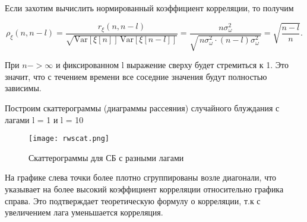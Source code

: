 Если захотим вычислить нормированный коэффициент корреляции, то получим

\[
\rho_{\xi}(n, n-l) = \frac{r_{\xi}(n, n-l)}{\sqrt{\mathrm{Var}[\xi[n]] \, \mathrm{Var}[\xi[n-l]]}}
= \frac{n\sigma_\omega^2}{\sqrt{\,n\sigma_\omega^2 \cdot (n-l)\sigma_\omega^2\,}}
= \sqrt{\frac{n-l}{n}}.
\]

При $n ->\infty$ и фиксированном l выражение сверху будет стремиться к 1. Это значит, что с течением времени все соседние значения
будут полностью зависимы.

Построим скаттерограммы (диаграммы рассеяния) случайного блуждания с лагами l = 1 и l = 10

\begin{figure}[H]
    \centering
    \texttt{[image: rwscat.png]}
    \caption{Скаттерограммы для СБ с разными лагами}
\end{figure}

На графике слева точки более плотно сгруппированы возле диагонали, что указывает на более высокий коэффициент корреляции относительно
графика справа. Это подтверждает теоретическую формулу о корреляции, т.к с увеличением лага уменьшается корреляция.


\endinput